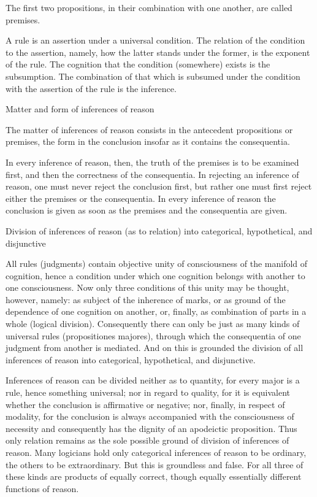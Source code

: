 The first two propositions, in their combination with one another, are called premises.

    A rule is an assertion under a universal condition.
    The relation of the condition to the assertion, namely,
    how the latter stands under the former, is the exponent of the rule.
    The cognition that the condition (somewhere) exists is the subsumption.
    The combination of that which is subsumed under the condition with
    the assertion of the rule is the inference.

Matter and form of inferences of reason

The matter of inferences of reason consists in
the antecedent propositions or premises,
the form in the conclusion insofar as it contains the consequentia.

    In every inference of reason, then, the truth of the premises is to be
    examined first, and then the correctness of the consequentia.
    In rejecting an inference of reason, one must never reject the conclusion first, but
    rather one must first reject either the premises or the consequentia.
    In every inference of reason the conclusion is given as soon as the
    premises and the consequentia are given.

Division of inferences of reason (as to relation)
into categorical, hypothetical, and disjunctive

All rules (judgments) contain objective unity of consciousness of
the manifold of cognition, hence a condition under which one cognition
belongs with another to one consciousness.
Now only three conditions of this unity may be thought, however, namely:
as subject of the inherence of marks, or
as ground of the dependence of one cognition on another, or, finally,
as combination of parts in a whole (logical division).
Consequently there can only be just as many kinds of universal rules
(propositiones majores), through which the consequentia of one judgment
from another is mediated.
And on this is grounded the division of all inferences of reason into
categorical, hypothetical, and disjunctive.

    Inferences of reason can be divided neither as to quantity,
    for every major is a rule, hence something universal;
    nor in regard to quality, for it is equivalent whether
    the conclusion is affirmative or negative;
    nor, finally, in respect of modality,
    for the conclusion is always accompanied with the consciousness of
    necessity and consequently has the dignity of an apodeictic proposition.
    Thus only relation remains as the sole possible
    ground of division of inferences of reason.
    Many logicians hold only categorical inferences of reason to be ordinary,
    the others to be extraordinary.
    But this is groundless and false.
    For all three of these kinds are products of equally correct,
    though equally essentially different functions of reason.

